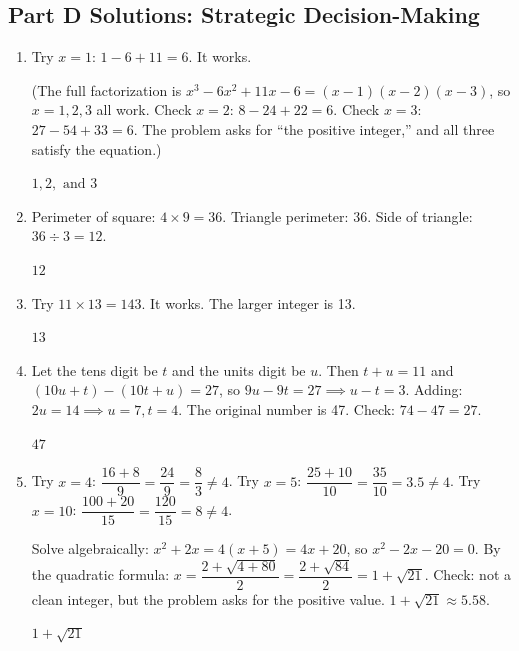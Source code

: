 \documentclass[14pt]{extarticle}
\begin{document}
\subsection*{Part D Solutions: Strategic Decision-Making}
\begin{enumerate}
  \item Try \(x = 1\): \(1 - 6 + 11 = 6\). It works.

  (The full factorization is \(x^3 - 6x^2 + 11x - 6 = (x-1)(x-2)(x-3)\), so \(x = 1, 2, 3\) all work. Check \(x = 2\): \(8 - 24 + 22 = 6\). Check \(x = 3\): \(27 - 54 + 33 = 6\). The problem asks for ``the positive integer,'' and all three satisfy the equation.)

  \(\boxed{1, 2, \text{ and } 3}\)

  \item Perimeter of square: \(4 \times 9 = 36\). Triangle perimeter: 36. Side of triangle: \(36 \div 3 = 12\).

  \(\boxed{12}\)

  \item Try \(11 \times 13 = 143\). It works. The larger integer is 13.

  \(\boxed{13}\)

  \item Let the tens digit be \(t\) and the units digit be \(u\). Then \(t + u = 11\) and \((10u + t) - (10t + u) = 27\), so \(9u - 9t = 27 \implies u - t = 3\). Adding: \(2u = 14 \implies u = 7, t = 4\). The original number is 47. Check: \(74 - 47 = 27\).

  \(\boxed{47}\)

  \item Try \(x = 4\): \(\dfrac{16 + 8}{9} = \dfrac{24}{9} = \dfrac{8}{3} \neq 4\). Try \(x = 5\): \(\dfrac{25 + 10}{10} = \dfrac{35}{10} = 3.5 \neq 4\). Try \(x = 10\): \(\dfrac{100 + 20}{15} = \dfrac{120}{15} = 8 \neq 4\).

  Solve algebraically: \(x^2 + 2x = 4(x + 5) = 4x + 20\), so \(x^2 - 2x - 20 = 0\). By the quadratic formula: \(x = \dfrac{2 + \sqrt{4 + 80}}{2} = \dfrac{2 + \sqrt{84}}{2} = 1 + \sqrt{21}\). Check: not a clean integer, but the problem asks for the positive value. \(1 + \sqrt{21} \approx 5.58\).

  \(\boxed{1 + \sqrt{21}}\)
\end{enumerate}
\end{document}
